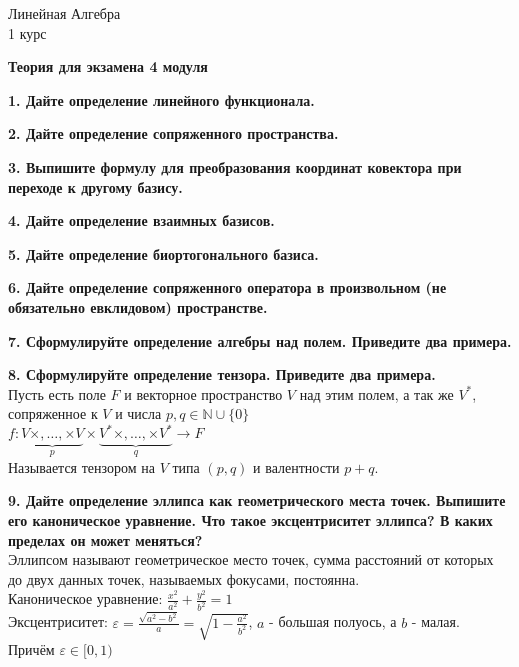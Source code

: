 \documentclass[11pt,a4paper]{article}
\begin{document}
\begin{center}

\begin{huge}
\textsf{Линейная Алгебра\\1 курс}
\end{huge}

\vspace{5mm}

\begin{LARGE}
\textsf{\textbf{Теория для экзамена 4 модуля}}
\end{LARGE}

\end{center}

\textbf{1. Дайте определение линейного функционала.\\}

\textbf{2. Дайте определение сопряженного пространства.\\}

\textbf{3. Выпишите формулу для преобразования координат ковектора при переходе к другому базису.\\}

\textbf{4. Дайте определение взаимных базисов.\\}

\textbf{5. Дайте определение биортогонального базиса.\\}

\textbf{6. Дайте определение сопряженного оператора в произвольном (не обязательно евклидовом) пространстве.\\}

\textbf{7. Сформулируйте определение алгебры над полем. Приведите два примера.\\}

\textbf{8. Сформулируйте определение тензора. Приведите два примера.\\}
Пусть есть поле $F$ и векторное пространство $V$ над этим полем, а так же $V^*$, сопряженное к $V$ и числа $p, q \in \mathbb{N} \cup \{0\}$
\\
$f: \underbrace{V \times, \dots, \times V}_{p} \times \underbrace{V^* \times, \dots, \times V^*}_{q} \to F$
\\
Называется тензором на $V$ типа $(p, q)$ и валентности $p + q$.

\textbf{9. Дайте определение эллипса как геометрического места точек. Выпишите его каноническое уравнение. Что такое эксцентриситет эллипса? В каких пределах он может меняться?\\}
Эллипсом называют геометрическое место точек, сумма расстояний от которых до двух данных точек, называемых фокусами, постоянна.
\\
Каноническое уравнение: $\frac{x^2}{a^2} + \frac{y^2}{b^2} = 1$
\\
Эксцентриситет: $\varepsilon = \frac{\sqrt{a^2 - b^2}}{a} = \sqrt{1 - \frac{a^2}{b^2}}$, $a$ - большая полуось, а $b$ - малая.
\\
Причём $\varepsilon \in [0, 1)$
\end{document}
